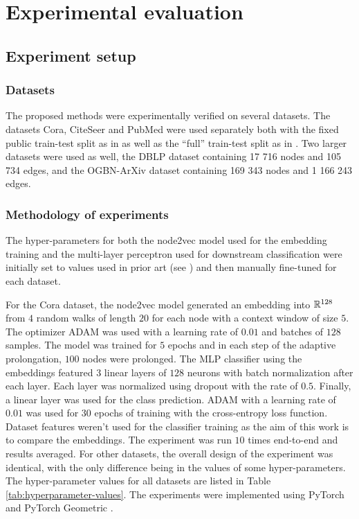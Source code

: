 \section{Experimental evaluation}

\subsection{Experiment setup}

\subsubsection{Datasets}

The proposed methods were experimentally verified on several datasets. The datasets Cora, CiteSeer and PubMed \cite{yang_revisiting_2016} were used separately both with the fixed public train-test split as in \cite{yang_revisiting_2016} as well as the \enquote{full} train-test split as in \cite{chen_fastgcn_2018}. Two larger datasets were used as well, the DBLP dataset \cite{bojchevski_deep_2018} containing 17 716 nodes and 105 734 edges, and the OGBN-ArXiv dataset \cite{hu_open_2021} containing 169 343 nodes and 1 166 243 edges.

\subsubsection{Methodology of experiments}

The hyper-parameters for both the node2vec model used for the embedding training and the multi-layer perceptron used for downstream classification were initially set to values used in prior art (see \cite{fey_fast_2019, hu_open_2021}) and then manually fine-tuned for each dataset.

For the Cora dataset, the node2vec model generated an embedding into \( \mathbb{R}^{128} \) from \( 4 \) random walks of length \( 20 \) for each node with a context window of size \( 5 \). The optimizer ADAM \cite{kingma_adam:_2017} was used with a learning rate of \( 0.01 \) and batches of \( 128 \) samples. The model was trained for \( 5 \) epochs and in each step of the adaptive prolongation, \( 100 \) nodes were prolonged. The MLP classifier using the embeddings featured \( 3 \) linear layers of \( 128 \) neurons with batch normalization after each layer. Each layer was normalized using dropout \cite{srivastava_dropout_2014} with the rate of \( 0.5 \). Finally, a linear layer was used for the class prediction. ADAM with a learning rate of \( 0.01 \)  was used for \( 30 \) epochs of training with the cross-entropy loss function. Dataset features weren't used for the classifier training as the aim of this work is to compare the embeddings. The experiment was run \( 10 \) times end-to-end and results averaged. For other datasets, the overall design of the experiment was identical, with the only difference being in the values of some hyper-parameters. The hyper-parameter values for all datasets are listed in Table \ref{tab:hyperparameter-values}. The experiments were implemented using PyTorch \cite{paszke_pytorch_2019} and PyTorch Geometric \cite{fey_fast_2019}.

